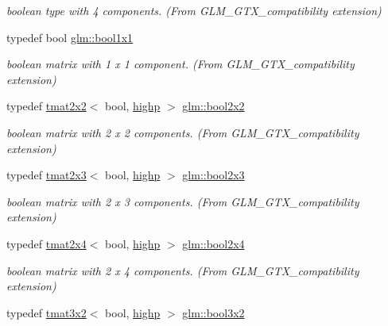 \begin{DoxyCompactItemize}
\begin{DoxyCompactList}\small\item\em boolean type with 4 components. (From G\+L\+M\+\_\+\+G\+T\+X\+\_\+compatibility extension) \end{DoxyCompactList}\item 
typedef bool \mbox{\hyperlink{group__gtx__compatibility_ga98d9d3da22aebc872ba38ce5afa0eff7}{glm\+::bool1x1}}
\begin{DoxyCompactList}\small\item\em boolean matrix with 1 x 1 component. (From G\+L\+M\+\_\+\+G\+T\+X\+\_\+compatibility extension) \end{DoxyCompactList}\item 
typedef \mbox{\hyperlink{structglm_1_1tmat2x2}{tmat2x2}}$<$ bool, \mbox{\hyperlink{namespaceglm_a0f04f086094c747d227af4425893f545ac6f7eab42eacbb10d59a58e95e362074}{highp}} $>$ \mbox{\hyperlink{group__gtx__compatibility_gaeb49db4b236907ba11f5b9117274b5d8}{glm\+::bool2x2}}
\begin{DoxyCompactList}\small\item\em boolean matrix with 2 x 2 components. (From G\+L\+M\+\_\+\+G\+T\+X\+\_\+compatibility extension) \end{DoxyCompactList}\item 
typedef \mbox{\hyperlink{structglm_1_1tmat2x3}{tmat2x3}}$<$ bool, \mbox{\hyperlink{namespaceglm_a0f04f086094c747d227af4425893f545ac6f7eab42eacbb10d59a58e95e362074}{highp}} $>$ \mbox{\hyperlink{group__gtx__compatibility_ga2d7e2c79179868a41d1f9f7a63f2ae52}{glm\+::bool2x3}}
\begin{DoxyCompactList}\small\item\em boolean matrix with 2 x 3 components. (From G\+L\+M\+\_\+\+G\+T\+X\+\_\+compatibility extension) \end{DoxyCompactList}\item 
typedef \mbox{\hyperlink{structglm_1_1tmat2x4}{tmat2x4}}$<$ bool, \mbox{\hyperlink{namespaceglm_a0f04f086094c747d227af4425893f545ac6f7eab42eacbb10d59a58e95e362074}{highp}} $>$ \mbox{\hyperlink{group__gtx__compatibility_gacbd1c62dfad23155dba803d7c5125288}{glm\+::bool2x4}}
\begin{DoxyCompactList}\small\item\em boolean matrix with 2 x 4 components. (From G\+L\+M\+\_\+\+G\+T\+X\+\_\+compatibility extension) \end{DoxyCompactList}\item 
typedef \mbox{\hyperlink{structglm_1_1tmat3x2}{tmat3x2}}$<$ bool, \mbox{\hyperlink{namespaceglm_a0f04f086094c747d227af4425893f545ac6f7eab42eacbb10d59a58e95e362074}{highp}} $>$ \mbox{\hyperlink{group__gtx__compatibility_ga6a944ad10139c8915bf72a832273ff02}{glm\+::bool3x2}}

\end{DoxyCompactItemize}
